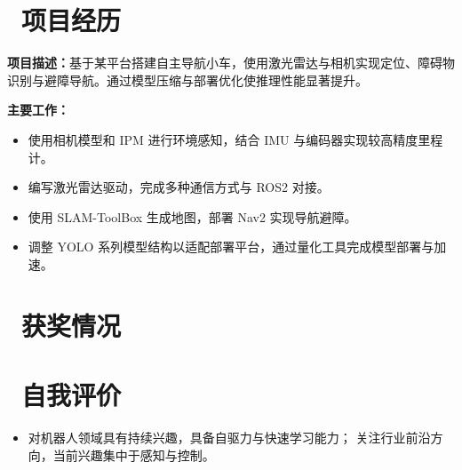 \documentclass{resume}
\begin{document}
\section{\texorpdfstring{\faUsers\ 项目经历}{项目经历}}
\textbf{项目描述：}基于某平台搭建自主导航小车，使用激光雷达与相机实现定位、障碍物识别与避障导航。通过模型压缩与部署优化使推理性能显著提升。

\textbf{主要工作：}
\begin{itemize}
  \item 使用相机模型和 IPM 进行环境感知，结合 IMU 与编码器实现较高精度里程计。
  \item 编写激光雷达驱动，完成多种通信方式与 ROS2 对接。
  \item 使用 SLAM-ToolBox 生成地图，部署 Nav2 实现导航避障。
  \item 调整 YOLO 系列模型结构以适配部署平台，通过量化工具完成模型部署与加速。
\end{itemize}

\section{\texorpdfstring{\faHeartO\ 获奖情况}{获奖情况}}

\section{\texorpdfstring{\faInfo\ 自我评价}{自我评价}}
\begin{itemize}
  \item 对机器人领域具有持续兴趣，具备自驱力与快速学习能力；
        关注行业前沿方向，当前兴趣集中于感知与控制。
\end{itemize}
\end{document}
